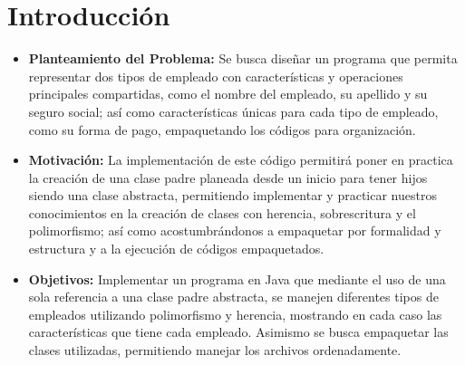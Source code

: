 \documentclass[letterpaper,12pt]{article}
\begin{document}
\tableofcontents
\clearpage

\section{Introducción}

\begin{itemize}
\item \textbf{Planteamiento del Problema:} Se busca diseñar un programa que permita representar dos tipos de empleado con características y operaciones principales compartidas, como el nombre del empleado, su apellido y su seguro social; así como características únicas para cada tipo de empleado, como su forma de pago, empaquetando los códigos para organización.

\item \textbf{Motivación:} La implementación de este código permitirá poner en practica la creación de una clase padre planeada desde un inicio para tener hijos siendo una clase abstracta, permitiendo implementar y practicar nuestros conocimientos en la creación de clases con herencia, sobrescritura y el polimorfismo; así como acostumbrándonos a empaquetar por formalidad y estructura y a la ejecución de códigos empaquetados.

\item \textbf{Objetivos:} Implementar un programa en Java que mediante el uso de una sola referencia a una clase padre abstracta, se manejen diferentes tipos de empleados utilizando polimorfismo y herencia, mostrando en cada caso las características que tiene cada empleado. Asimismo se busca empaquetar las clases utilizadas, permitiendo manejar los archivos ordenadamente.


\end{itemize}
\end{document}
